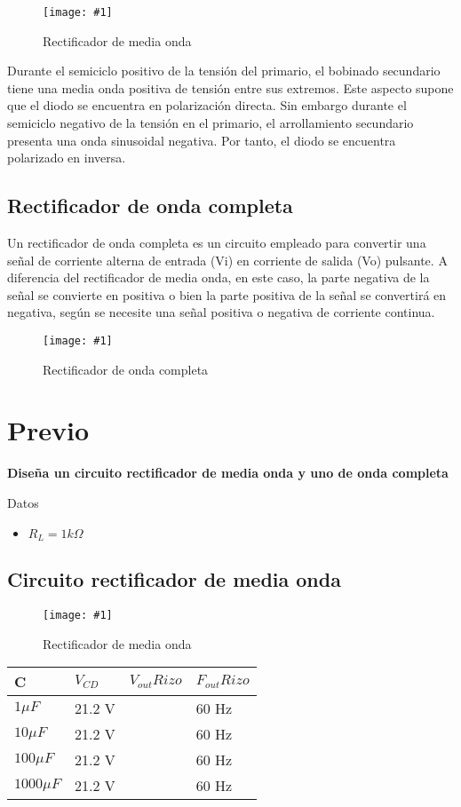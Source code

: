 \documentclass{mylib/reporteConCalif}
\newcommand{\insertImage}[3]{
	\begin{figure}[H]
		\centering
		\texttt{[image: \#1]}
		\caption{#2}
	\end{figure}
}
\begin{document}
\insertImage{img/labdisp_pract4/hwr}{Rectificador de media onda}{8}
	
Durante el semiciclo positivo de la tensión del primario, el bobinado secundario tiene una media onda positiva de tensión entre sus extremos. Este aspecto supone que el diodo se encuentra en polarización directa. Sin embargo durante el semiciclo negativo de la tensión en el primario, el arrollamiento secundario presenta una onda sinusoidal negativa. Por tanto, el diodo se encuentra polarizado en inversa.

\subsection{Rectificador de onda completa}

Un rectificador de onda completa es un circuito empleado para convertir una señal de corriente alterna de entrada (Vi) en corriente de salida (Vo) pulsante. A diferencia del rectificador de media onda, en este caso, la parte negativa de la señal se convierte en positiva o bien la parte positiva de la señal se convertirá en negativa, según se necesite una señal positiva o negativa de corriente continua.

\insertImage{img/labdisp_pract4/fwr}{Rectificador de onda completa}{8}


\newpage
\section{Previo}

\textbf{Diseña un circuito rectificador de media onda y uno de onda completa}

Datos
\begin{itemize}
	\item $R_L = 1k\Omega$
\end{itemize}

\subsection{Circuito rectificador de media onda}

	\insertImage{img/labdisp_pract4/hwrc}{Rectificador de media onda}{12}
	\begin{center}
	\begin{tabu} to 0.8\textwidth { | X[c] | X[c] | X[c] | X[c] | }
		 \hline
		 C & $V_{CD}$ & $V_{out}Rizo$ & $F_{out}Rizo$ \\
		 \hline
		 $1 \mu F$ & 21.2 V &  & 60 Hz \\
		 \hline
		 $10 \mu F$ & 21.2 V &  & 60 Hz \\
		 \hline
		 $100 \mu F$ & 21.2 V &  & 60 Hz \\
		 \hline
		 $1000 \mu F$ & 21.2 V &  & 60 Hz \\
		 \hline
	\end{tabu}
	\end{center}
\end{document}
